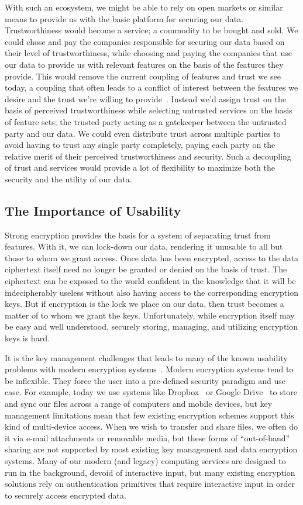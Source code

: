 With such an ecosystem, we might be able to rely on open markets or
similar means to provide us with the basic platform for securing our
data. Trustworthiness would become a service; a commodity to be bought
and sold. We could chose and pay the companies responsible for
securing our data based on their level of trustworthiness, while
choosing and paying the companies that use our data to provide us with
relevant features on the basis of the features they provide. This
would remove the current coupling of features and trust we see today,
a coupling that often leads to a conflict of interest between the
features we desire and the trust we're willing to
provide~\cite{Flowerday2006}. Instead we'd assign trust on the basis
of perceived trustworthiness while selecting untrusted services on the
basis of feature sets; the trusted party acting as a gatekeeper
between the untrusted party and our data. We could even distribute
trust across multiple parties to avoid having to trust any single
party completely, paying each party on the relative merit of their
perceived trustworthiness and security. Such a decoupling of trust and
services would provide a lot of flexibility to maximize both the
security and the utility of our data.

\subsection{The Importance of Usability}

Strong encryption provides the basis for a system of separating trust
from features. With it, we can lock-down our data, rendering it
unusable to all but those to whom we grant access. Once data has been
encrypted, access to the data ciphertext itself need no longer be
granted or denied on the basis of trust. The ciphertext can be exposed
to the world confident in the knowledge that it will be indecipherably
useless without also having access to the corresponding encryption
keys. But if encryption is the lock we place on our data, then trust
becomes a matter of to whom we grant the keys. Unfortunately, while
encryption itself may be easy and well understood, securely storing,
managing, and utilizing encryption keys is hard.

It is the key management challenges that leads to many of the known
usability problems with modern encryption systems~\cite{Whitten1999,
  Sweikata2009, Kher2005}. Modern encryption systems tend to be
inflexible. They force the user into a pre-defined security paradigm
and use case. For example, today we use systems like
Dropbox~\cite{dropbox} or Google Drive~\cite{google-drive} to store
and sync our files across a range of computers and mobile devices, but
key management limitations mean that few existing encryption schemes
support this kind of multi-device access. When we wish to transfer and
share files, we often do it via e-mail attachments or removable media,
but these forms of ``out-of-band'' sharing are not supported by most
existing key management and data encryption systems. Many of our
modern (and legacy) computing services are designed to run in the
background, devoid of interactive input, but many existing encryption
solutions rely on authentication primitives that require interactive
input in order to securely access encrypted data.

